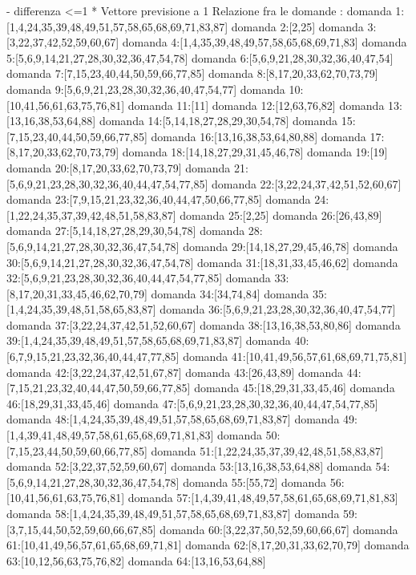 - differenza <=1
 * Vettore previsione a 1
 Relazione fra le domande :
domanda 1:[1,4,24,35,39,48,49,51,57,58,65,68,69,71,83,87]
domanda 2:[2,25]
domanda 3:[3,22,37,42,52,59,60,67]
domanda 4:[1,4,35,39,48,49,57,58,65,68,69,71,83]
domanda 5:[5,6,9,14,21,27,28,30,32,36,47,54,78]
domanda 6:[5,6,9,21,28,30,32,36,40,47,54]
domanda 7:[7,15,23,40,44,50,59,66,77,85]
domanda 8:[8,17,20,33,62,70,73,79]
domanda 9:[5,6,9,21,23,28,30,32,36,40,47,54,77]
domanda 10:[10,41,56,61,63,75,76,81]
domanda 11:[11]
domanda 12:[12,63,76,82]
domanda 13:[13,16,38,53,64,88]
domanda 14:[5,14,18,27,28,29,30,54,78]
domanda 15:[7,15,23,40,44,50,59,66,77,85]
domanda 16:[13,16,38,53,64,80,88]
domanda 17:[8,17,20,33,62,70,73,79]
domanda 18:[14,18,27,29,31,45,46,78]
domanda 19:[19]
domanda 20:[8,17,20,33,62,70,73,79]
domanda 21:[5,6,9,21,23,28,30,32,36,40,44,47,54,77,85]
domanda 22:[3,22,24,37,42,51,52,60,67]
domanda 23:[7,9,15,21,23,32,36,40,44,47,50,66,77,85]
domanda 24:[1,22,24,35,37,39,42,48,51,58,83,87]
domanda 25:[2,25]
domanda 26:[26,43,89]
domanda 27:[5,14,18,27,28,29,30,54,78]
domanda 28:[5,6,9,14,21,27,28,30,32,36,47,54,78]
domanda 29:[14,18,27,29,45,46,78]
domanda 30:[5,6,9,14,21,27,28,30,32,36,47,54,78]
domanda 31:[18,31,33,45,46,62]
domanda 32:[5,6,9,21,23,28,30,32,36,40,44,47,54,77,85]
domanda 33:[8,17,20,31,33,45,46,62,70,79]
domanda 34:[34,74,84]
domanda 35:[1,4,24,35,39,48,51,58,65,83,87]
domanda 36:[5,6,9,21,23,28,30,32,36,40,47,54,77]
domanda 37:[3,22,24,37,42,51,52,60,67]
domanda 38:[13,16,38,53,80,86]
domanda 39:[1,4,24,35,39,48,49,51,57,58,65,68,69,71,83,87]
domanda 40:[6,7,9,15,21,23,32,36,40,44,47,77,85]
domanda 41:[10,41,49,56,57,61,68,69,71,75,81]
domanda 42:[3,22,24,37,42,51,67,87]
domanda 43:[26,43,89]
domanda 44:[7,15,21,23,32,40,44,47,50,59,66,77,85]
domanda 45:[18,29,31,33,45,46]
domanda 46:[18,29,31,33,45,46]
domanda 47:[5,6,9,21,23,28,30,32,36,40,44,47,54,77,85]
domanda 48:[1,4,24,35,39,48,49,51,57,58,65,68,69,71,83,87]
domanda 49:[1,4,39,41,48,49,57,58,61,65,68,69,71,81,83]
domanda 50:[7,15,23,44,50,59,60,66,77,85]
domanda 51:[1,22,24,35,37,39,42,48,51,58,83,87]
domanda 52:[3,22,37,52,59,60,67]
domanda 53:[13,16,38,53,64,88]
domanda 54:[5,6,9,14,21,27,28,30,32,36,47,54,78]
domanda 55:[55,72]
domanda 56:[10,41,56,61,63,75,76,81]
domanda 57:[1,4,39,41,48,49,57,58,61,65,68,69,71,81,83]
domanda 58:[1,4,24,35,39,48,49,51,57,58,65,68,69,71,83,87]
domanda 59:[3,7,15,44,50,52,59,60,66,67,85]
domanda 60:[3,22,37,50,52,59,60,66,67]
domanda 61:[10,41,49,56,57,61,65,68,69,71,81]
domanda 62:[8,17,20,31,33,62,70,79]
domanda 63:[10,12,56,63,75,76,82]
domanda 64:[13,16,53,64,88]

